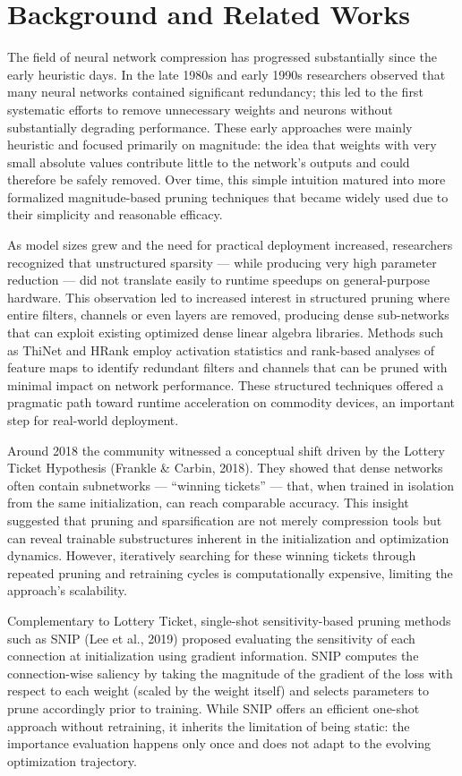 \documentclass[12pt,a4paper]{report}
\begin{document}
\section{Background and Related Works}
The field of neural network compression has progressed substantially since the early heuristic days. In the late 1980s and early 1990s researchers observed that many neural networks contained significant redundancy; this led to the first systematic efforts to remove unnecessary weights and neurons without substantially degrading performance. These early approaches were mainly heuristic and focused primarily on magnitude: the idea that weights with very small absolute values contribute little to the network's outputs and could therefore be safely removed. Over time, this simple intuition matured into more formalized magnitude-based pruning techniques that became widely used due to their simplicity and reasonable efficacy.

As model sizes grew and the need for practical deployment increased, researchers recognized that unstructured sparsity — while producing very high parameter reduction — did not translate easily to runtime speedups on general-purpose hardware. This observation led to increased interest in structured pruning where entire filters, channels or even layers are removed, producing dense sub-networks that can exploit existing optimized dense linear algebra libraries. Methods such as ThiNet and HRank employ activation statistics and rank-based analyses of feature maps to identify redundant filters and channels that can be pruned with minimal impact on network performance. These structured techniques offered a pragmatic path toward runtime acceleration on commodity devices, an important step for real-world deployment.

Around 2018 the community witnessed a conceptual shift driven by the Lottery Ticket Hypothesis (Frankle \& Carbin, 2018). They showed that dense networks often contain subnetworks — “winning tickets” — that, when trained in isolation from the same initialization, can reach comparable accuracy. This insight suggested that pruning and sparsification are not merely compression tools but can reveal trainable substructures inherent in the initialization and optimization dynamics. However, iteratively searching for these winning tickets through repeated pruning and retraining cycles is computationally expensive, limiting the approach's scalability.

Complementary to Lottery Ticket, single-shot sensitivity-based pruning methods such as SNIP (Lee et al., 2019) proposed evaluating the sensitivity of each connection at initialization using gradient information. SNIP computes the connection-wise saliency by taking the magnitude of the gradient of the loss with respect to each weight (scaled by the weight itself) and selects parameters to prune accordingly prior to training. While SNIP offers an efficient one-shot approach without retraining, it inherits the limitation of being static: the importance evaluation happens only once and does not adapt to the evolving optimization trajectory.
\end{document}
